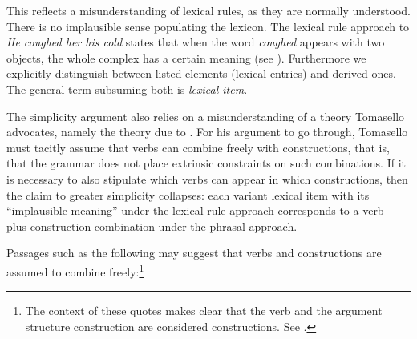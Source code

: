 \noindent
This reflects a misunderstanding of lexical rules, as they are normally understood.  There is no implausible sense populating the lexicon.
The lexical rule approach to \emph{He coughed her his cold} states that when the word \emph{coughed} appears with
two objects, the whole complex has a certain meaning (see \citealp[]{Mueller2006d}). Furthermore we explicitly distinguish between listed elements
(lexical entries) and derived ones. The general term subsuming both is \emph{lexical item}.


The simplicity argument also relies on a misunderstanding of a theory Tomasello advocates, namely the
theory due to \citet{Goldberg95a, Goldberg2006a}.  For his argument to go through, Tomasello must tacitly assume
that verbs can combine freely with constructions, that is, that the grammar does not place extrinsic
constraints on such combinations.  If it is necessary to also stipulate which verbs can appear in
which constructions, then the claim to greater simplicity collapses: each variant lexical item with
its ``implausible meaning'' under the lexical rule approach corresponds to a verb-plus-construction
combination under the phrasal approach. 

Passages such as the following may suggest that verbs and constructions are assumed to combine
freely:\footnote{The context of these quotes makes clear that the verb and the argument structure construction are considered 
constructions.  See \citet[, ex.~(2)]{Goldberg2006a}.} 


